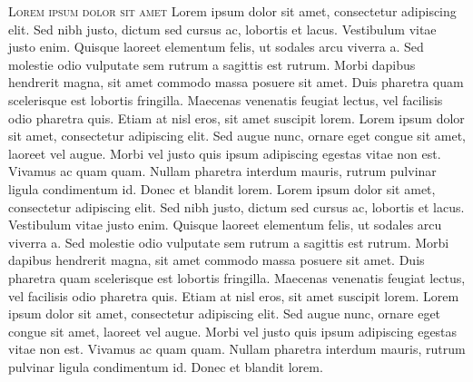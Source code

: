 \lettrine{L}{orem ipsum dolor sit amet} 
Lorem ipsum dolor sit amet, consectetur adipiscing elit. Sed nibh justo, dictum sed cursus ac, lobortis et lacus. Vestibulum vitae justo enim. Quisque laoreet elementum felis, ut sodales arcu viverra a. Sed molestie odio vulputate sem rutrum a sagittis est rutrum. Morbi dapibus hendrerit magna, sit amet commodo massa posuere sit amet. Duis pharetra quam scelerisque est lobortis fringilla. Maecenas venenatis feugiat lectus, vel facilisis odio pharetra quis. Etiam at nisl eros, sit amet suscipit lorem. Lorem ipsum dolor sit amet, consectetur adipiscing elit. Sed augue nunc, ornare eget congue sit amet, laoreet vel augue. Morbi vel justo quis ipsum adipiscing egestas vitae non est. Vivamus ac quam quam. Nullam pharetra
                                                    interdum mauris, rutrum pulvinar ligula condimentum id. Donec et blandit lorem. Lorem ipsum dolor sit amet, consectetur adipiscing elit. Sed nibh justo, dictum sed cursus ac, lobortis et lacus. Vestibulum vitae justo enim. Quisque laoreet elementum felis, ut sodales arcu viverra a. Sed molestie odio vulputate sem rutrum a sagittis est rutrum. Morbi dapibus hendrerit magna, sit amet commodo massa posuere sit amet. Duis pharetra quam scelerisque est lobortis fringilla. Maecenas venenatis feugiat lectus, vel facilisis odio pharetra quis. Etiam at nisl eros, sit amet suscipit lorem. Lorem ipsum dolor sit amet, consectetur adipiscing elit. Sed augue nunc, ornare eget congue sit amet, laoreet vel augue. Morbi vel justo quis ipsum adipiscing egestas vitae non est. Vivamus ac quam quam. Nullam pharetra
                                                    interdum mauris, rutrum pulvinar ligula condimentum id. Donec et blandit lorem. 
\pagebreak







                                                                  